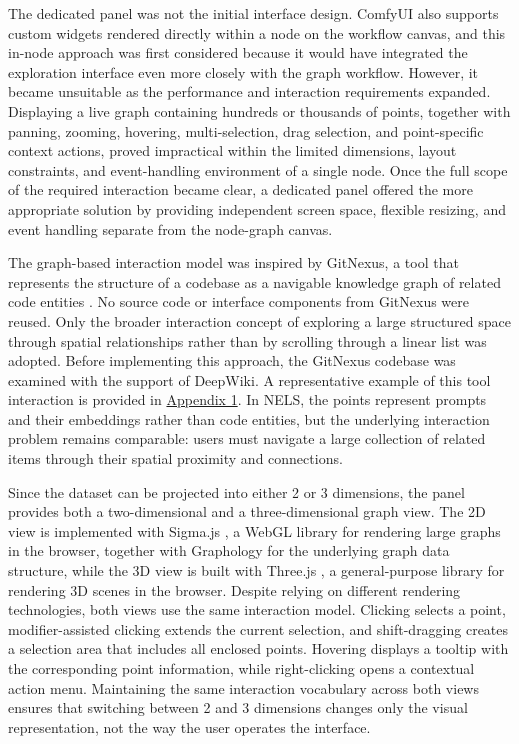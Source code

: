 The dedicated panel was not the initial interface design. ComfyUI also supports custom widgets rendered directly within a node on the workflow canvas, and this in-node approach was first considered because it would have integrated the exploration interface even more closely with the graph workflow. However, it became unsuitable as the performance and interaction requirements expanded. Displaying a live graph containing hundreds or thousands of points, together with panning, zooming, hovering, multi-selection, drag selection, and point-specific context actions, proved impractical within the limited dimensions, layout constraints, and event-handling environment of a single node. Once the full scope of the required interaction became clear, a dedicated panel offered the more appropriate solution by providing independent screen space, flexible resizing, and event handling separate from the node-graph canvas.

The graph-based interaction model was inspired by GitNexus, a tool that represents the structure of a codebase as a navigable knowledge graph of related code entities \cite{patwari2026gitnexus}. No source code or interface components from GitNexus were reused. Only the broader interaction concept of exploring a large structured space through spatial relationships rather than by scrolling through a linear list was adopted. Before implementing this approach, the GitNexus codebase was examined with the support of DeepWiki. A representative example of this tool interaction is provided in \hyperref[app:1-gitnexus]{Appendix 1}. In NELS, the points represent prompts and their embeddings rather than code entities, but the underlying interaction problem remains comparable: users must navigate a large collection of related items through their spatial proximity and connections.

Since the dataset can be projected into either 2 or 3 dimensions, the panel provides both a two-dimensional and a three-dimensional graph view. The 2D view is implemented with Sigma.js \cite{jacomy2024sigmajs}, a WebGL library for rendering large graphs in the browser, together with Graphology \cite{plique2021graphology} for the underlying graph data structure, while the 3D view is built with Three.js \cite{threejs2026}, a general-purpose library for rendering 3D scenes in the browser. Despite relying on different rendering technologies, both views use the same interaction model. Clicking selects a point, modifier-assisted clicking extends the current selection, and shift-dragging creates a selection area that includes all enclosed points. Hovering displays a tooltip with the corresponding point information, while right-clicking opens a contextual action menu. Maintaining the same interaction vocabulary across both views ensures that switching between 2 and 3 dimensions changes only the visual representation, not the way the user operates the interface.

